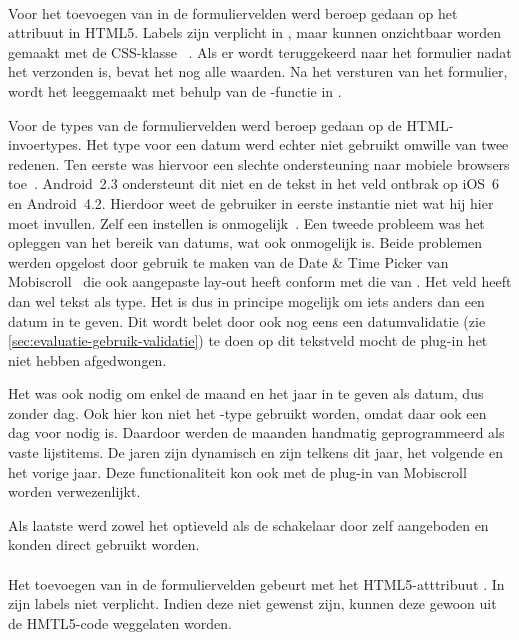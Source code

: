 \paragraph{\jqm} 
Voor het toevoegen van  in de formuliervelden werd beroep gedaan op het attribuut in HTML5. 
Labels zijn verplicht in \jqm{}, maar kunnen onzichtbaar worden gemaakt met de CSS-klasse ~\cite{JQuery2013}. 
Als er wordt teruggekeerd naar het formulier nadat het verzonden is, bevat het nog alle waarden. 
Na het versturen van het formulier, wordt het leeggemaakt met behulp van de -functie in \js{}.
 
Voor de types van de formuliervelden werd beroep gedaan op de HTML-invoertypes. 
Het type voor een datum werd echter niet gebruikt omwille van twee redenen.
Ten eerste was hiervoor een slechte ondersteuning naar mobiele browsers toe~\cite{Deveria2013c}.
Android~2.3 ondersteunt dit niet en de tekst in het veld ontbrak op iOS~6 en Android~4.2.
Hierdoor weet de gebruiker in eerste instantie niet wat hij hier moet invullen. 
Zelf een  instellen is onmogelijk~\cite{Berjon2012}. 
Een tweede probleem was het opleggen van het bereik van datums, wat ook onmogelijk is. 
Beide problemen werden opgelost door gebruik te maken van de Date \& Time Picker van Mobiscroll~\cite{Mobiscroll2013} die ook aangepaste lay-out heeft conform met die van \jqm{}. 
Het veld heeft dan wel tekst als type.
Het is dus in principe mogelijk om iets anders dan een datum in te geven. 
Dit wordt belet door ook nog eens een datumvalidatie (zie \ref{sec:evaluatie-gebruik-validatie}) te doen op dit tekstveld mocht de plug-in het niet hebben afgedwongen.
 
Het was ook nodig om enkel de maand en het jaar in te geven als datum, dus zonder dag.
Ook hier kon niet het -type gebruikt worden, omdat daar ook een dag voor nodig is. 
Daardoor werden de maanden handmatig geprogrammeerd als vaste lijstitems. 
De jaren zijn dynamisch en zijn telkens dit jaar, het volgende en het vorige jaar. 
Deze functionaliteit kon ook met de plug-in van Mobiscroll worden verwezenlijkt.

Als laatste werd zowel het optieveld als de schakelaar door \jqm{} zelf aangeboden en konden direct gebruikt worden. 
 
\paragraph{\lungo} 
Het toevoegen van  in de formuliervelden gebeurt met het HTML5-atttribuut .
In \lungo{} zijn labels niet verplicht.
Indien deze niet gewenst zijn, kunnen deze gewoon uit de HMTL5-code weggelaten worden.

